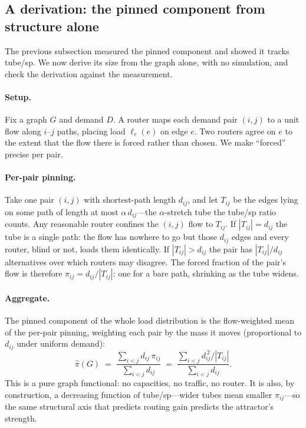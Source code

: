 
\subsection{A derivation: the pinned component from structure alone}
\label{sec:attractor-thm}

The previous subsection measured the pinned component and showed it tracks
tube/sp. We now derive its size from the graph alone, with no simulation, and
check the derivation against the measurement.

\paragraph{Setup.} Fix a graph $G$ and demand $D$. A router maps each demand
pair $(i,j)$ to a unit flow along $i$--$j$ paths, placing load $\ell_r(e)$ on
edge $e$. Two routers agree on $e$ to the extent that the flow there is forced
rather than chosen. We make ``forced'' precise per pair.

\paragraph{Per-pair pinning.} Take one pair $(i,j)$ with shortest-path length
$d_{ij}$, and let $T_{ij}$ be the edges lying on some path of length at most
$\alpha\,d_{ij}$---the $\alpha$-stretch tube the tube/sp ratio counts. Any
reasonable router confines the $(i,j)$ flow to $T_{ij}$. If $|T_{ij}|=d_{ij}$
the tube is a single path: the flow has nowhere to go but those $d_{ij}$ edges
and every router, blind or not, loads them identically. If $|T_{ij}|>d_{ij}$
the pair has $|T_{ij}|/d_{ij}$ alternatives over which routers may disagree.
The forced fraction of the pair's flow is therefore
$\pi_{ij}=d_{ij}/|T_{ij}|$: one for a bare path, shrinking as the tube widens.

\paragraph{Aggregate.} The pinned component of the whole load distribution is
the flow-weighted mean of the per-pair pinning, weighting each pair by the
mass it moves (proportional to $d_{ij}$ under uniform demand):
\begin{equation}
\widehat{\pi}(G) \;=\;
\frac{\sum_{i<j} d_{ij}\,\pi_{ij}}{\sum_{i<j} d_{ij}}
\;=\;
\frac{\sum_{i<j} d_{ij}^{\,2}/|T_{ij}|}{\sum_{i<j} d_{ij}}.
\label{eq:pinned}
\end{equation}
This is a pure graph functional: no capacities, no traffic, no router. It is
also, by construction, a decreasing function of tube/sp---wider tubes mean
smaller $\pi_{ij}$---so the same structural axis that predicts routing gain
predicts the attractor's strength.

